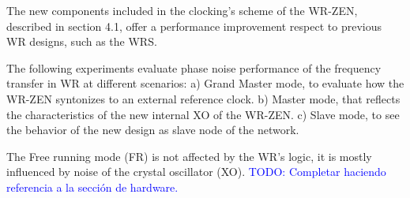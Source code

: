 
The new components included in the clocking's scheme of the WR-ZEN, described in section  4.1, offer a performance improvement respect to previous WR designs, such as the WRS. 


The following experiments evaluate phase noise performance of the frequency transfer in WR at different scenarios: a) Grand Master mode, to evaluate how the WR-ZEN syntonizes to an external reference clock. b) Master mode, that reflects the characteristics of the new internal XO of the WR-ZEN. c) Slave mode, to see the behavior of the new design as slave node of the network.

The Free running mode (FR) is not affected by the WR's logic, it is mostly influenced by noise of the crystal oscillator (XO). \textcolor{blue}{TODO: Completar haciendo referencia a la sección de hardware.}

